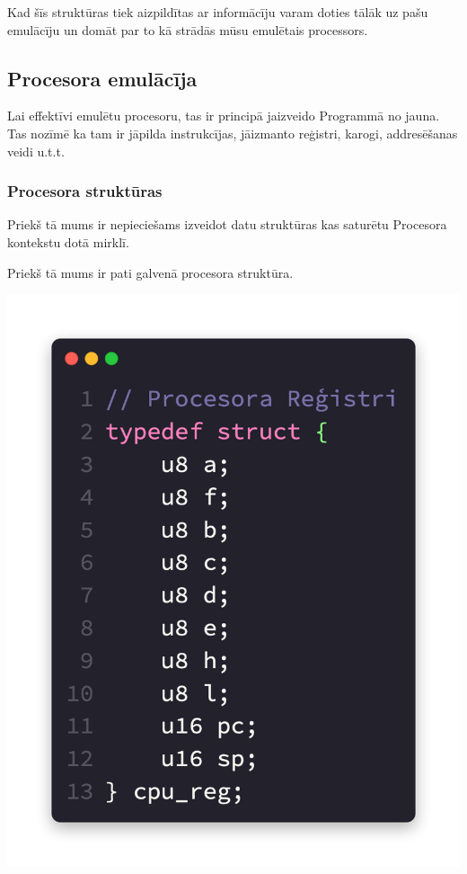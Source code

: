 \documentclass[12pt]{article}
\begin{document}
	Kad šīs struktūras tiek aizpildītas ar informācīju varam doties tālāk uz pašu emulācīju un domāt par to kā strādās mūsu emulētais processors.
	\pagebreak
	
	\subsection{Procesora emulācīja}
	Lai effektīvi emulētu procesoru, tas ir principā jaizveido Programmā no jauna. Tas nozīmē ka tam ir jāpilda instrukcījas, jāizmanto reģistri, karogi, addresēšanas veidi u.t.t.
	
	\subsubsection{Procesora struktūras}
	Priekš tā mums ir nepieciešams izveidot datu struktūras kas saturētu Procesora kontekstu dotā mirklī.
	
	Priekš tā mums ir pati galvenā procesora struktūra.
	
	\includegraphics[scale=0.5]{img/reg.png}
	
\end{document}
